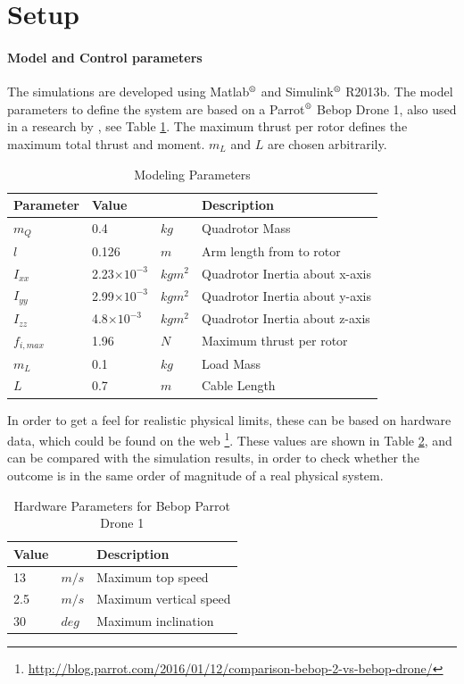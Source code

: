\section{Setup}\label{sec:exp.setup}
\paragraph{Model and Control parameters}
The simulations are developed using Matlab$^\text{\textregistered} $ and Simulink$^\text{\textregistered} $ R2013b.
The model parameters to define the system are based on a Parrot$^\text{\textregistered} $ Bebop Drone 1, also used in a research by \cite{Cornelis2014}, see Table \ref{tab:set.par}. The maximum thrust per rotor defines the maximum total thrust and moment. $ m_L $ and $ L $ are chosen arbitrarily.
\begin{table}[h!]
	\centering
	\begin{tabular}{|l|ll|l|}
		\hline
		\textbf{Parameter}&\textbf{Value}&&\textbf{Description}\\
		\hline
		$ m_Q $&0.4& $ kg $&Quadrotor Mass\\
		$ l $&0.126& $ m $&Arm length from \a{qr} \a{cm} to rotor\\
		$ I_{xx} $&2.23$ \times 10^{-3}$&$kgm^2 $&Quadrotor Inertia about x-axis\\
		$ I_{yy} $&2.99$ \times 10^{-3}$&$kgm^2 $&Quadrotor Inertia about y-axis\\
		$ I_{zz} $&4.8$ \times 10^{-3}$&$kgm^2 $&Quadrotor Inertia about z-axis\\
    	$ f_{i,max} $&1.96 &$ N $&Maximum thrust per rotor\\
		$ m_L $&0.1 &$ kg $&Load Mass\\
		$ L $&0.7 &$ m $& Cable Length\\		
		\hline		
	\end{tabular}
	\caption{Modeling Parameters}
	\label{tab:set.par}
\end{table}

In order to get a feel for realistic physical limits, these can be based on hardware data, which could be found on the web \footnote{\url{http://blog.parrot.com/2016/01/12/comparison-bebop-2-vs-bebop-drone/}\label{url:set.bebop}}. 
These values are shown in Table \ref{tab:set.par2}, and can be compared with the simulation results, in order to check whether the outcome is in the same order of magnitude of a real physical system.
\begin{table}[h!]
	\centering
	\begin{tabular}{|ll|l|}
		\hline
		\textbf{Value}&&\textbf{Description}\\
		\hline
		13 & $ m/s $&Maximum top speed\\
		2.5& $ m/s $&Maximum vertical speed\\
		30 &$ deg $&Maximum inclination\\
		\hline
	\end{tabular}
	\caption{Hardware Parameters for Bebop Parrot Drone 1}
	\label{tab:set.par2}
\end{table}

